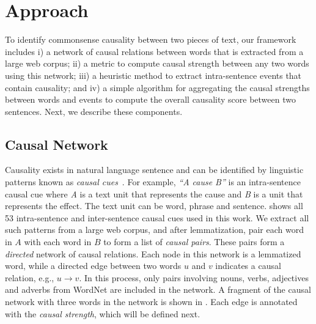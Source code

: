 \section{Approach}
\label{sec:approach}

To identify commonsense causality between two
pieces of text, our framework includes i) a network of causal relations
between words that is extracted from a large web corpus; ii) a
metric to compute causal strength between any two words using this
network; iii) a heuristic method to extract intra-sentence events
that contain causality; and iv) a simple algorithm for aggregating
the causal strengths between words and events to compute the overall
causality score between two sentences. Next, we describe these
components.
%
\subsection{Causal Network}
\label{sec:network}
Causality exists in natural language sentence and can be identified by
linguistic patterns known as {\em causal cues}~\cite{ChangC04}.
For example, \textit{``A cause B''} is an intra-sentence causal
cue where \textit{A} is a text unit that represents the cause
and \textit{B} is a unit that represents the effect.
The text unit can be word, phrase and sentence.
 shows all 53 intra-sentence and inter-sentence
causal cues used in this work.
We extract all such patterns from a large
web corpus, and after lemmatization, pair each word in $A$ with each word
in $B$ to form a list of \textit{causal pairs}.
These pairs form a {\em directed} network of causal relations. Each
node in this network is a lemmatized word, while a directed edge between two words
$u$ and $v$ indicates a causal relation, e.g., $u \rightarrow v$.
In this process, only pairs involving nouns, verbs,
adjectives and adverbs from WordNet are included in the network.
A fragment of the causal network with three words in the network is
shown in .
Each edge is annotated with the {\em causal strength}, which will be defined
next.

